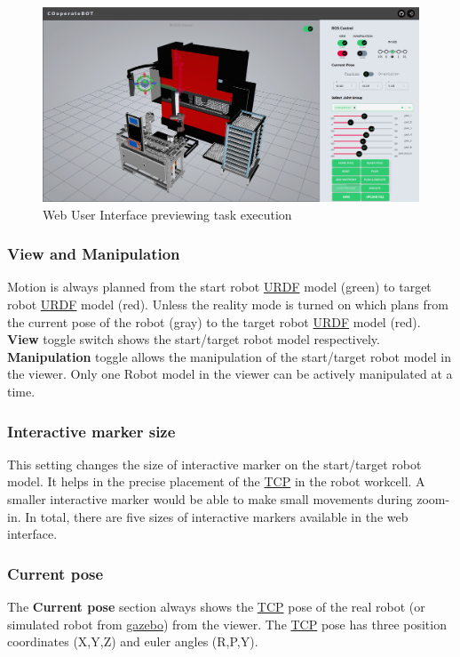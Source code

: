 \begin{figure}[h]
    \centering
    \includegraphics[width=1\textwidth]{figures/webui/web-ui-preview.png}
    \caption{Web User Interface previewing task execution}
    \label{fig:web-ui-preview}
\end{figure}

\subsubsection{View and Manipulation}
\label{subsubsec:web-ui-view-manipulation}
Motion is always planned from the start robot \hyperref[acro:URDF]{URDF} model (green) to target robot \hyperref[acro:URDF]{URDF} model (red). Unless the reality mode is turned on which plans from the current pose of the robot (gray) to the target robot \hyperref[acro:URDF]{URDF} model (red). \textbf{View} toggle switch shows the start/target robot model respectively. \textbf{Manipulation} toggle allows the manipulation of the start/target robot model in the viewer. Only one Robot model in the viewer can be actively manipulated at a time.


\subsubsection{Interactive marker size}
\label{subsubsec:web-ui-im-size}
This setting changes the size of interactive marker on the start/target robot model. It helps in the precise placement of the \hyperref[acro:TCP]{TCP} in the robot workcell. A smaller interactive marker would be able to make small movements during zoom-in. In total, there are five sizes of interactive markers available in the web interface.


\subsubsection{Current pose}
\label{subsubsec:web-ui-current-pose}
The \textbf{Current pose} section always shows the \hyperref[acro:TCP]{TCP} pose of the real robot (or simulated robot from \hyperref[acro:Gazebo]{gazebo}) from the viewer. The \hyperref[acro:TCP]{TCP} pose has three position coordinates (X,Y,Z) and euler angles (R,P,Y).


